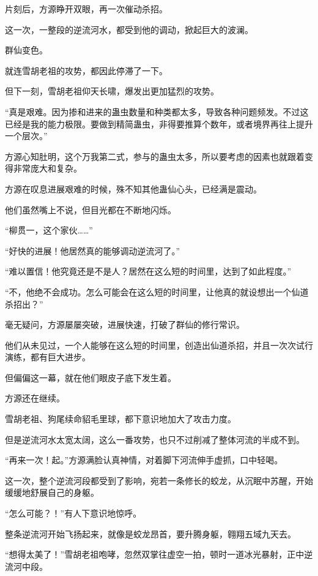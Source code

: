 
\begin{this_body}

片刻后，方源睁开双眼，再一次催动杀招。

这一次，一整段的逆流河水，都受到他的调动，掀起巨大的波澜。

群仙变色。

就连雪胡老祖的攻势，都因此停滞了一下。

但下一刻，雪胡老祖仰天长啸，爆发出更加猛烈的攻势。

“真是艰难。因为掺和进来的蛊虫数量和种类都太多，导致各种问题频发。不过这已经是我的能力极限。要做到精简蛊虫，非得要推算个数年，或者境界再往上提升一个层次。”

方源心知肚明，这个万我第二式，参与的蛊虫太多，所以要考虑的因素也就跟着变得非常庞大和复杂。

方源在叹息进展艰难的时候，殊不知其他蛊仙心头，已经满是震动。

他们虽然嘴上不说，但目光都在不断地闪烁。

“柳贯一，这个家伙……”

“好快的进展！他居然真的能够调动逆流河了。”

“难以置信！他究竟还是不是人？居然在这么短的时间里，达到了如此程度。”

“不，他绝不会成功。怎么可能会在这么短的时间里，让他真的就设想出一个仙道杀招出？”

毫无疑问，方源屡屡突破，进展快速，打破了群仙的修行常识。

他们从未见过，一个人能够在这么短的时间里，创造出仙道杀招，并且一次次试行演练，都有巨大进步。

但偏偏这一幕，就在他们眼皮子底下发生着。

方源还在继续。

雪胡老祖、狗尾续命貂毛里球，都下意识地加大了攻击力度。

但是逆流河水太宽太阔，这么一番攻势，也只不过削减了整体河流的半成不到。

“再来一次！起。”方源满脸认真神情，对着脚下河流伸手虚抓，口中轻喝。

这一次，整个逆流河段都受到了影响，宛若一条修长的蛟龙，从沉眠中苏醒，开始缓缓地舒展自己的身躯。

“怎么可能？！”有人下意识地惊呼。

整条逆流河开始飞扬起来，就像是蛟龙昂首，要升腾身躯，翱翔五域九天去。

“想得太美了！”雪胡老祖咆哮，忽然双掌往虚空一拍，顿时一道冰光暴射，正中逆流河中段。


\end{this_body}
